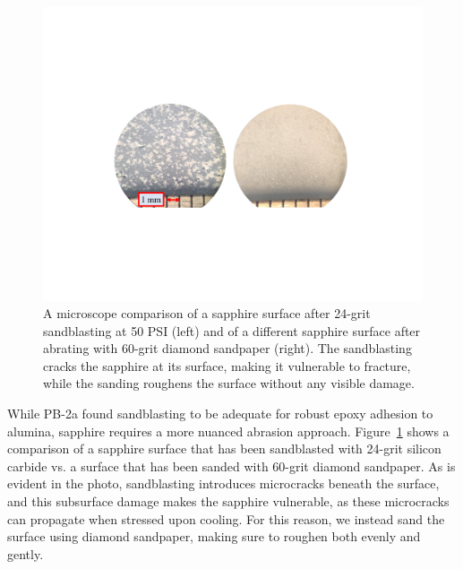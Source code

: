 \begin{figure}[!t]
    \centering
    \includegraphics[width=0.7\linewidth, trim=5cm 6.5cm 5cm 6.5cm, clip]{ARCoating/Figures/sapphire_roughening.pdf}
    \caption[A microscope comparison of the sapphire surface after sandblasting vs. after sanding.]{A microscope comparison of a sapphire surface after 24-grit sandblasting at 50 PSI (left) and of a different sapphire surface after abrating with 60-grit diamond sandpaper (right). The sandblasting cracks the sapphire at its surface, making it vulnerable to fracture, while the sanding roughens the surface without any visible damage.}
    \label{fig:sapphire_roughening}
\end{figure}

While PB-2a found sandblasting to be adequate for robust epoxy adhesion to alumina, sapphire requires a more nuanced abrasion approach. Figure~\ref{fig:sapphire_roughening} shows a comparison of a sapphire surface that has been sandblasted with 24-grit silicon carbide vs. a surface that has been sanded with 60-grit diamond sandpaper. As is evident in the photo, sandblasting introduces microcracks beneath the surface, and this subsurface damage makes the sapphire vulnerable, as these microcracks can propagate when stressed upon cooling. For this reason, we instead sand the surface using diamond sandpaper, making sure to roughen both evenly and gently. 

